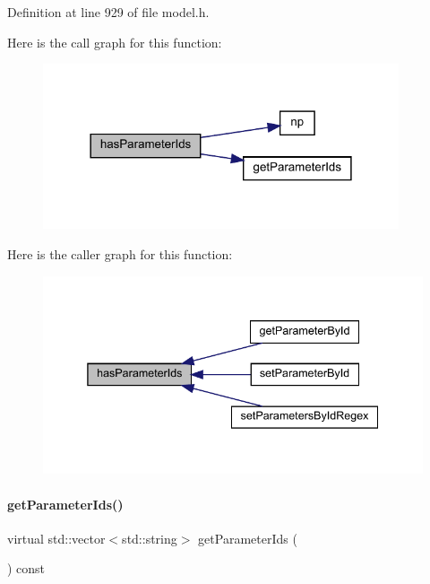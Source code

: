 Definition at line 929 of file model.\+h.

Here is the call graph for this function\+:
\nopagebreak
\begin{figure}[H]
\begin{center}
\leavevmode
\includegraphics[width=298pt]{classamici_1_1_model_a216de46b6ca89c0bcc4f1c1418d2c06a_cgraph}
\end{center}
\end{figure}
Here is the caller graph for this function\+:
\nopagebreak
\begin{figure}[H]
\begin{center}
\leavevmode
\includegraphics[width=338pt]{classamici_1_1_model_a216de46b6ca89c0bcc4f1c1418d2c06a_icgraph}
\end{center}
\end{figure}
\mbox{\label{classamici_1_1_model_ad5647cbe7c4989a7692955cbdbf5b3cd}} 
\paragraph{\texorpdfstring{get\+Parameter\+Ids()}{getParameterIds()}}
{\footnotesize\ttfamily virtual std\+::vector$<$std\+::string$>$ get\+Parameter\+Ids (\begin{DoxyParamCaption}{ }\end{DoxyParamCaption}) const\hspace{0.3cm}{\ttfamily [virtual]}}

